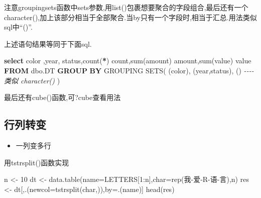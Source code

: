 \documentclass[
]{book}
\newenvironment{Shaded}{\begin{snugshade}}{\end{snugshade}}
\newcommand{\AttributeTok}[1]{\textcolor[rgb]{0.77,0.63,0.00}{#1}}
\newcommand{\CommentTok}[1]{\textcolor[rgb]{0.56,0.35,0.01}{\textit{#1}}}
\newcommand{\DataTypeTok}[1]{\textcolor[rgb]{0.13,0.29,0.53}{#1}}
\newcommand{\DecValTok}[1]{\textcolor[rgb]{0.00,0.00,0.81}{#1}}
\newcommand{\FunctionTok}[1]{\textcolor[rgb]{0.00,0.00,0.00}{#1}}
\newcommand{\KeywordTok}[1]{\textcolor[rgb]{0.13,0.29,0.53}{\textbf{#1}}}
\newcommand{\NormalTok}[1]{#1}
\newcommand{\OperatorTok}[1]{\textcolor[rgb]{0.81,0.36,0.00}{\textbf{#1}}}
\newcommand{\OtherTok}[1]{\textcolor[rgb]{0.56,0.35,0.01}{#1}}
\newcommand{\SpecialCharTok}[1]{\textcolor[rgb]{0.00,0.00,0.00}{#1}}
\newcommand{\StringTok}[1]{\textcolor[rgb]{0.31,0.60,0.02}{#1}}
\providecommand{\tightlist}{%
  \setlength{\itemsep}{0pt}\setlength{\parskip}{0pt}}
\begin{document}
注意groupingsets函数中sets参数,用list()包裹想要聚合的字段组合,最后还有一个character(),加上该部分相当于全部聚合.当by只有一个字段时,相当于汇总.用法类似sql中``()''.

上述语句结果等同于下面sql.

\begin{Shaded}
\begin{Highlighting}[]
\KeywordTok{select}\NormalTok{ color ,}\DataTypeTok{year}\NormalTok{, status,}\FunctionTok{count}\NormalTok{(}\OperatorTok{*}\NormalTok{) }\FunctionTok{count}\NormalTok{,}\FunctionTok{sum}\NormalTok{(amount) amount,}\FunctionTok{sum}\NormalTok{(}\FunctionTok{value}\NormalTok{) }\FunctionTok{value} 
\KeywordTok{FROM}\NormalTok{ dbo.DT}
\KeywordTok{GROUP} \KeywordTok{BY}
\FunctionTok{GROUPING}\NormalTok{ SETS(}
\NormalTok{(color),}
\NormalTok{(}\DataTypeTok{year}\NormalTok{,status),}
\NormalTok{() }\CommentTok{{-}{-}{-}{-} 类似 character()}
\NormalTok{)}
\end{Highlighting}
\end{Shaded}

最后还有cube()函数,可?cube查看用法

\hypertarget{ux884cux5217ux8f6cux53d8}{%
\subsection{行列转变}\label{ux884cux5217ux8f6cux53d8}}

\begin{itemize}
\tightlist
\item
  一列变多行
\end{itemize}

用tstrsplit()函数实现

\begin{Shaded}
\begin{Highlighting}[]
\NormalTok{n }\OtherTok{\textless{}{-}} \DecValTok{10}
\NormalTok{dt }\OtherTok{\textless{}{-}} \FunctionTok{data.table}\NormalTok{(}\AttributeTok{name=}\NormalTok{LETTERS[}\DecValTok{1}\SpecialCharTok{:}\NormalTok{n],}\AttributeTok{char=}\FunctionTok{rep}\NormalTok{(}\StringTok{\textquotesingle{}我{-}爱{-}R{-}语{-}言\textquotesingle{}}\NormalTok{),n)}
\NormalTok{res }\OtherTok{\textless{}{-}}\NormalTok{ dt[,.(}\AttributeTok{newcol=}\FunctionTok{tstrsplit}\NormalTok{(char,}\StringTok{\textquotesingle{}{-}\textquotesingle{}}\NormalTok{)),by}\OtherTok{=}\NormalTok{.(name)]}
\FunctionTok{head}\NormalTok{(res)}
\end{Highlighting}
\end{Shaded}
\end{document}
